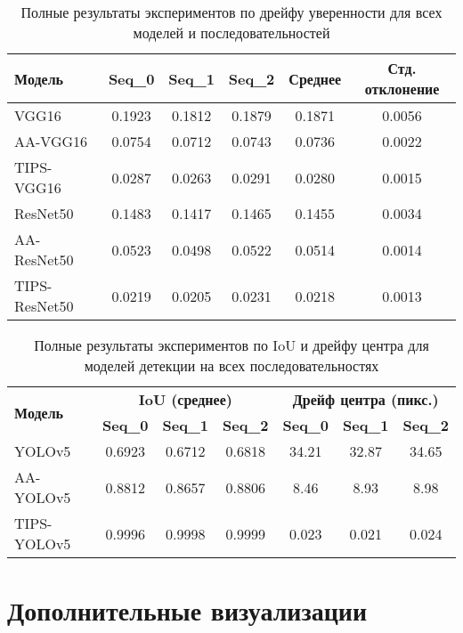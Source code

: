 \begin{table}[ht]
\centering
\caption{Полные результаты экспериментов по дрейфу уверенности для всех моделей и последовательностей}
\label{tab:full_confidence_drift}
\begin{tabular}{|l|c|c|c|c|c|}
\hline
\textbf{Модель} & \textbf{Seq\_0} & \textbf{Seq\_1} & \textbf{Seq\_2} & \textbf{Среднее} & \textbf{Стд. отклонение} \\ \hline
VGG16 & 0.1923 & 0.1812 & 0.1879 & 0.1871 & 0.0056 \\ \hline
AA-VGG16 & 0.0754 & 0.0712 & 0.0743 & 0.0736 & 0.0022 \\ \hline
TIPS-VGG16 & 0.0287 & 0.0263 & 0.0291 & 0.0280 & 0.0015 \\ \hline
ResNet50 & 0.1483 & 0.1417 & 0.1465 & 0.1455 & 0.0034 \\ \hline
AA-ResNet50 & 0.0523 & 0.0498 & 0.0522 & 0.0514 & 0.0014 \\ \hline
TIPS-ResNet50 & 0.0219 & 0.0205 & 0.0231 & 0.0218 & 0.0013 \\ \hline
\end{tabular}
\end{table}

\begin{table}[ht]
\centering
\caption{Полные результаты экспериментов по IoU и дрейфу центра для моделей детекции на всех последовательностях}
\label{tab:full_detection_metrics}
\begin{tabular}{|l|c|c|c|c|c|c|}
\hline
\multirow{2}{*}{\textbf{Модель}} & \multicolumn{3}{c|}{\textbf{IoU (среднее)}} & \multicolumn{3}{c|}{\textbf{Дрейф центра (пикс.)}} \\ \cline{2-7}
 & \textbf{Seq\_0} & \textbf{Seq\_1} & \textbf{Seq\_2} & \textbf{Seq\_0} & \textbf{Seq\_1} & \textbf{Seq\_2} \\ \hline
YOLOv5 & 0.6923 & 0.6712 & 0.6818 & 34.21 & 32.87 & 34.65 \\ \hline
AA-YOLOv5 & 0.8812 & 0.8657 & 0.8806 & 8.46 & 8.93 & 8.98 \\ \hline
TIPS-YOLOv5 & 0.9996 & 0.9998 & 0.9999 & 0.023 & 0.021 & 0.024 \\ \hline
\end{tabular}
\end{table}

\section{Дополнительные визуализации}
\label{appendix:additional_visualizations}

